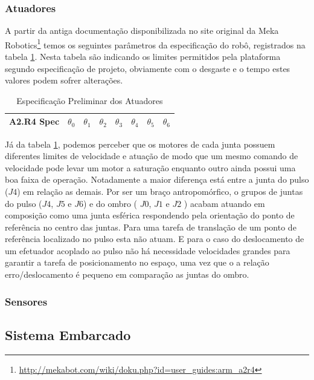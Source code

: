 \subsubsection{Atuadores}

A partir da antiga documentação disponibilizada no site original da Meka Robotics\footnote{\url{http://mekabot.com/wiki/doku.php?id=user_guides:arm_a2r4}} temos os seguintes parâmetros da especificação do robô, registrados na tabela \ref{tab:a2armActuationDoc}. Nesta tabela são indicando os limites permitidos pela plataforma segundo especificação de projeto, obviamente com o desgaste e o tempo estes valores podem sofrer alterações.

\begin{table}[H]
    \centering
    \begin{tabular}{c|ccccccc}
         \hline
         A2.R4 Spec & $\theta_0$ & $\theta_1$ & $\theta_2$ & $\theta_3$ & $\theta_4$ & $\theta_5$ & $\theta_6$\\
         \hline
         
         \hline
    \end{tabular}
    \caption{Especificação Preliminar dos Atuadores \cite{nocite}}
    \label{tab:a2armActuationDoc}
\end{table}

Já da tabela \ref{tab:a2armActuationDoc}, podemos perceber que os motores de cada junta possuem diferentes limites de velocidade e atuação de modo que um mesmo comando de velocidade pode levar um motor a saturação enquanto outro ainda possui uma boa faixa de operação. Notadamente a maior diferença está entre a junta do pulso ($J4$) em relação as demais. Por ser um braço antropomórfico, o grupos de juntas do pulso ($J4$, $J5$ e $J6$) e do ombro ( $J0$, $J1$ e $J2$ ) acabam atuando em composição como uma junta esférica respondendo pela orientação do ponto de referência no centro das juntas. Para uma tarefa de translação de um ponto de referência localizado no pulso esta não atuam. E para o caso do deslocamento de um efetuador acoplado ao pulso não há necessidade velocidades grandes para garantir a tarefa de posicionamento no espaço, uma vez que o a relação erro/deslocamento é pequeno em comparação as juntas do ombro.

\subsubsection{Sensores}

\subsection{Sistema Embarcado}


